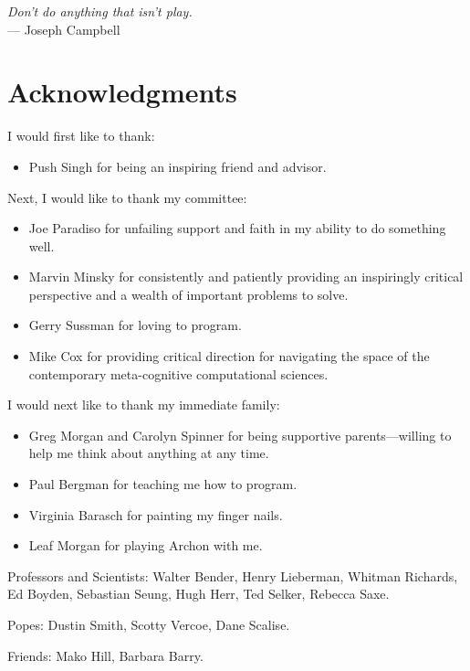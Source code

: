 



\begin{flushright}{\slshape    
Don't do anything that isn't play.} \\ \medskip
    --- Joseph Campbell
\end{flushright}



\bigskip

\begingroup
\let\clearpage\relax
\let\cleardoublepage\relax
\let\cleardoublepage\relax
\chapter*{Acknowledgments}

I would first like to thank:

\begin{itemize}
\item{Push Singh for being an inspiring friend and advisor.}
\end{itemize}

Next, I would like to thank my committee:

\begin{itemize}
\item{Joe Paradiso for unfailing support and faith in my ability to do
  something well.}
\item{Marvin Minsky for consistently and patiently providing an
  inspiringly critical perspective and a wealth of important problems
  to solve.}
\item{Gerry Sussman for loving to program.}
\item{Mike Cox for providing critical direction for navigating the
  space of the contemporary meta-cognitive computational sciences.}
\end{itemize}

I would next like to thank my immediate family:

\begin{itemize}
\item{Greg Morgan and Carolyn Spinner for being supportive parents---willing to help me think about anything at any time.}
\item{Paul Bergman for teaching me how to program.}
\item{Virginia Barasch for painting my finger nails.}
\item{Leaf Morgan for playing Archon with me.}
\end{itemize}

Professors and Scientists: Walter Bender, Henry Lieberman, Whitman
Richards, Ed Boyden, Sebastian Seung, Hugh Herr, Ted Selker, Rebecca
Saxe.

Popes: Dustin Smith, Scotty Vercoe, Dane Scalise.

Friends: Mako Hill, Barbara Barry.

\endgroup

